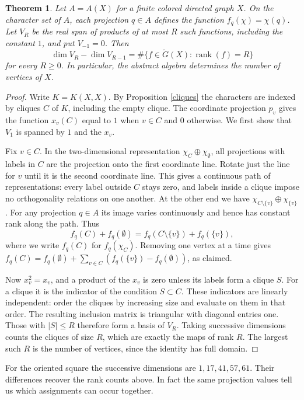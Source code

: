 \documentclass[11pt,a4paper]{article}
\newtheorem{thm}{Theorem}[section]
\begin{document}
\begin{thm}\label{abstractranks}
Let $A=A(X)$ for a finite colored directed graph $X$. On the character set of $A$, each projection $q\in A$ defines the function $f_q(\chi)=\chi(q)$. Let $V_R$ be the real span of products of at most $R$ such functions, including the constant $1$, and put $V_{-1}=0$. Then
\[
 \dim V_R-\dim V_{R-1}
 =\#\{f\in\widetilde G(X):\operatorname{rank}(f)=R\}
\]
for every $R\geq0$. In particular, the abstract algebra determines the number of vertices of $X$.
\end{thm}
\begin{proof}
Write $K=K(X,X)$. By Proposition \ref{cliques} the characters are indexed by cliques $C$ of $K$, including the empty clique. The coordinate projection $p_v$ gives the function $x_v(C)$ equal to $1$ when $v\in C$ and $0$ otherwise. We first show that $V_1$ is spanned by $1$ and the $x_v$.

Fix $v\in C$. In the two-dimensional representation $\chi_C\oplus\chi_\emptyset$, all projections with labels in $C$ are the projection onto the first coordinate line. Rotate just the line for $v$ until it is the second coordinate line. This gives a continuous path of representations: every label outside $C$ stays zero, and labels inside a clique impose no orthogonality relations on one another. At the other end we have $\chi_{C\setminus\{v\}}\oplus\chi_{\{v\}}$. For any projection $q\in A$ its image varies continuously and hence has constant rank along the path. Thus
\[
 f_q(C)+f_q(\emptyset)=f_q(C\setminus\{v\})+f_q(\{v\}),
\]
where we write $f_q(C)$ for $f_q(\chi_C)$. Removing one vertex at a time gives $f_q(C)=f_q(\emptyset)+\sum_{v\in C}(f_q(\{v\})-f_q(\emptyset))$, as claimed.

Now $x_v^2=x_v$, and a product of the $x_v$ is zero unless its labels form a clique $S$. For a clique it is the indicator of the condition $S\subset C$. These indicators are linearly independent: order the cliques by increasing size and evaluate on them in that order. The resulting inclusion matrix is triangular with diagonal entries one. Those with $|S|\leq R$ therefore form a basis of $V_R$. Taking successive dimensions counts the cliques of size $R$, which are exactly the maps of rank $R$. The largest such $R$ is the number of vertices, since the identity has full domain.
\end{proof}

For the oriented square the successive dimensions are $1,17,41,57,61$. Their differences recover the rank counts above. In fact the same projection values tell us which assignments can occur together.
\end{document}
